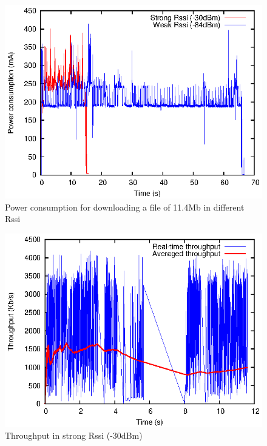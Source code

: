 \documentclass[journal]{IEEEtran}
\begin{document}
\begin{figure}
\centering
\includegraphics[scale=1]{energy_comparision.eps}
\caption{Power consumption for downloading a file of 11.4Mb in different Rssi}
\end{figure}

\begin{figure}
\centering
\includegraphics[scale=0.95]{strong_traffic.eps}
\caption{Throughput in strong Rssi (-30dBm)}
\end{figure}
\end{document}
